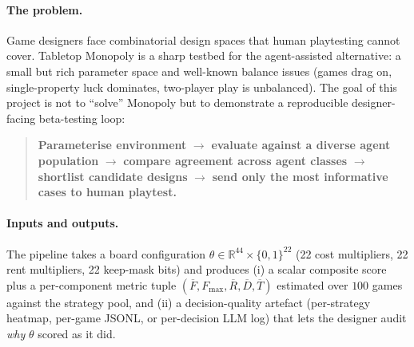 \documentclass[10pt]{article}
\begin{document}
\paragraph{The problem.} Game designers face combinatorial design
spaces that human playtesting cannot cover. Tabletop Monopoly is a
sharp testbed for the agent-assisted alternative: a small but rich
parameter space and well-known balance issues (games drag on,
single-property luck dominates, two-player play is unbalanced). The
goal of this project is not to ``solve'' Monopoly but to demonstrate a
reproducible designer-facing beta-testing loop:
\begin{quote}
\textbf{Parameterise environment} $\to$ \textbf{evaluate against a
diverse agent population} $\to$ \textbf{compare agreement across
agent classes} $\to$ \textbf{shortlist candidate designs} $\to$
\textbf{send only the most informative cases to human playtest.}
\end{quote}

\paragraph{Inputs and outputs.} The pipeline takes a board configuration
$\theta \in \mathbb{R}^{44} \times \{0,1\}^{22}$ (22 cost multipliers,
22 rent multipliers, 22 keep-mask bits) and produces (i) a scalar
composite score plus a per-component metric tuple
$(\overline{F}, F_{\max}, \overline{R}, \overline{D}, \overline{T})$
estimated over $100$ games against the strategy pool, and (ii) a
decision-quality artefact (per-strategy heatmap, per-game JSONL, or
per-decision LLM log) that lets the designer audit \emph{why} $\theta$
scored as it did.
\end{document}
